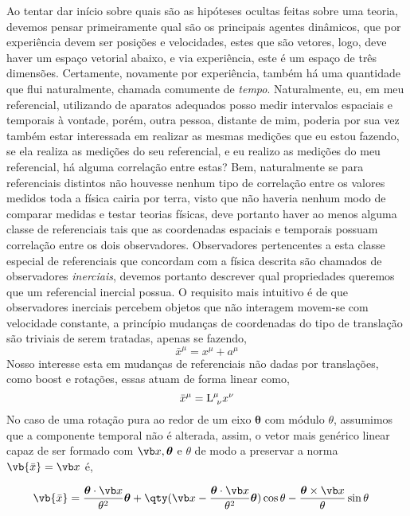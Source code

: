 \documentclass[twoside]{amsart}
\numberwithin{equation}{section}
\begin{document}
\begin{refsection}
Ao tentar dar início sobre quais são as hipóteses ocultas feitas sobre uma teoria, devemos 
pensar primeiramente qual são os principais agentes dinâmicos, que por experiência devem ser 
posições e velocidades, estes que são vetores, logo, deve haver um espaço vetorial abaixo, 
e via experiência, este é um espaço de três dimensões. Certamente, novamente por experiência,  
também há uma quantidade que flui naturalmente, chamada comumente de \emph{tempo}. 
Naturalmente, eu, em meu referencial, utilizando de aparatos adequados posso medir intervalos 
espaciais e temporais à vontade, porém, outra pessoa, distante de mim, poderia por sua vez 
também estar interessada em realizar as mesmas medições que eu estou fazendo, se ela realiza 
as medições do seu referencial, e eu realizo as medições do meu referencial, há alguma 
correlação entre estas? Bem, naturalmente se para referenciais distintos não houvesse nenhum 
tipo de correlação entre os valores medidos toda a física cairia por terra, visto que não 
haveria nenhum modo de comparar medidas e testar teorias físicas, deve portanto haver ao menos 
alguma classe de referenciais tais que as coordenadas espaciais e temporais possuam correlação 
entre os dois observadores. Observadores pertencentes a esta classe especial de referenciais que concordam com a física descrita são chamados de observadores \emph{inerciais}, devemos portanto descrever qual propriedades queremos que um referencial inercial possua. O requisito mais intuitivo é de que observadores inerciais percebem objetos que não interagem movem-se com velocidade constante, a princípio mudanças de coordenadas do tipo de translação são triviais de serem tratadas, apenas se fazendo, $${\bar x}^\mu=x^\mu+a^\mu$$
Nosso interesse esta em mudanças de referenciais não dadas por translações, como boost e rotações, essas atuam de forma linear como, $${\bar x}^\mu={\textup L}^\mu_{\ \nu}x^\nu$$
No caso de uma rotação pura ao redor de um eixo $\boldsymbol\theta$ com módulo $\theta$, assumimos que a componente temporal não é alterada, assim, o vetor mais genérico linear capaz de ser formado com $\vb x,\boldsymbol\theta$ e $\theta$ de modo a preservar a norma $\vb{\bar x}=\vb x$ é,

\begin{align}
    \vb{\bar x}&=\frac{\boldsymbol\theta\cdot\vb x}{\theta^2}\boldsymbol\theta+\qty(\vb x-\frac{\boldsymbol\theta\cdot\vb x}{\theta^2}\boldsymbol\theta)\cos\theta-\frac{\boldsymbol\theta\times \vb x}{\theta}\sin\theta
\end{align}


\end{refsection}
\end{document}
